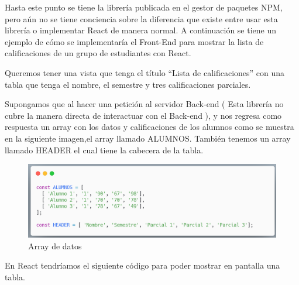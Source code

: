 
Hasta este punto se tiene la librería publicada en el gestor de paquetes NPM, pero aún no se tiene conciencia sobre la diferencia que existe entre usar esta librería o implementar React de manera normal.
A continuación se tiene un ejemplo de cómo se implementaría el Front-End para mostrar la lista de calificaciones de un grupo de estudiantes con React.

Queremos tener una vista que tenga el título “Lista de calificaciones” con una tabla que tenga el nombre, el semestre y tres calificaciones parciales. 

Supongamos que al hacer una petición al servidor Back-end ( Esta librería no cubre la manera directa de interactuar con el Back-end ), y nos regresa como respuesta un array con los datos y calificaciones de los alumnos como se muestra en la siguiente imagen,el array llamado ALUMNOS. También tenemos un array llamado HEADER el cual tiene la cabecera de la tabla.

 \newline
     \begin{figure}[H]
    \includegraphics[width=1\textwidth]{./Imagenes/array.png}
     \caption[Crear nuevos directorios]{Array de datos}
         \end{figure}
    \newline

En React tendríamos el siguiente código para poder mostrar en pantalla una tabla.

